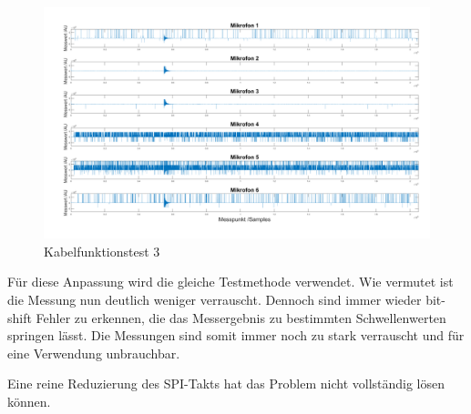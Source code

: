 \begin{figure}[!h]
	\begin{center}
		\includegraphics[scale=0.2]{Sections/Tests/Test_2_d}
	\end{center}
	\caption{Kabelfunktionstest 3}
	\label{fig:Test_2_d}
\end{figure}

Für diese Anpassung wird die gleiche Testmethode verwendet. Wie vermutet ist die Messung nun deutlich weniger verrauscht. Dennoch sind immer wieder bit-shift Fehler zu erkennen, die das Messergebnis zu bestimmten Schwellenwerten springen lässt. Die Messungen sind somit immer noch zu stark verrauscht und für eine Verwendung unbrauchbar. 

Eine reine Reduzierung des  SPI-Takts hat das Problem nicht vollständig lösen können.

